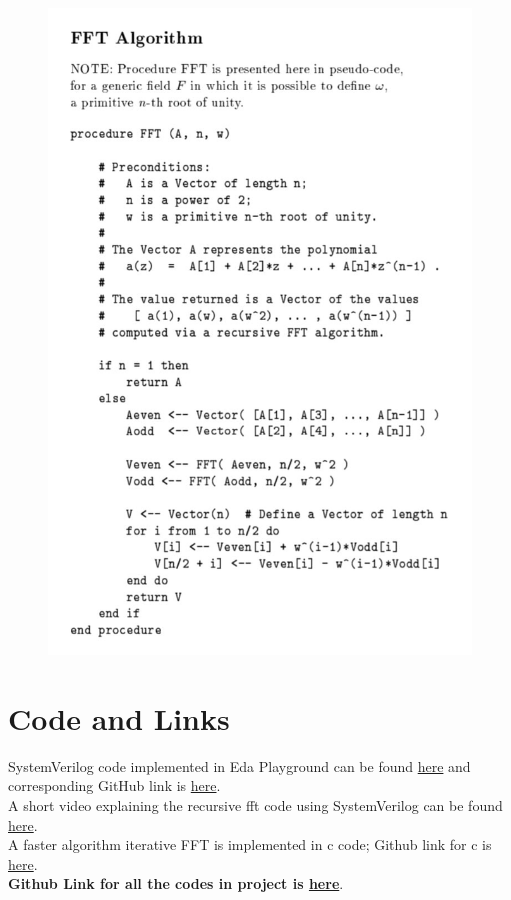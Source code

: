 \documentclass{report}
\begin{document}
\begin{figure}[h]
\includegraphics[scale=0.25]{A.jpeg}
\centering
\end{figure}
\section{Code and Links}
SystemVerilog code implemented in Eda Playground can be found \href{https://www.edaplayground.com/x/BaB5}{here} and corresponding GitHub link is \href{https://github.com/gouthamagv/FFT-FPGA-GVV/tree/main/FFT_in_verilog}{here}.\\
A short video explaining the recursive fft code using SystemVerilog can be found \href{https://youtu.be/lhDAXMt5oSE}{here}. \\
A faster algorithm iterative FFT is implemented in c code; Github link for c is \href{https://github.com/gouthamagv/FFT-FPGA-GVV/blob/main/FFT_iterative.c}{here}.\\
 \textbf{Github Link for all the codes in project is \href{https://github.com/gouthamagv/FFT-FPGA-GVV}{here}}.
\end{document}
